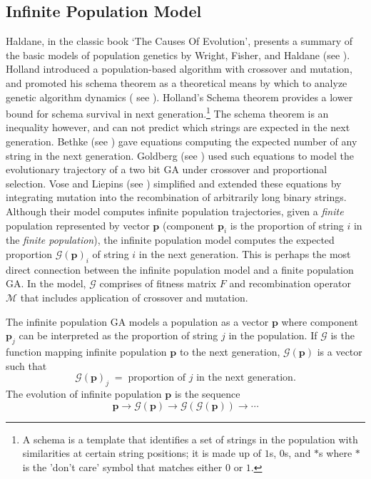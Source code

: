 \subsection{Infinite Population Model}
Haldane, in the classic book `The Causes Of Evolution', presents a summary of the basic models of population genetics 
by Wright, Fisher, and Haldane (see \cite{Haldane1932}). 
Holland introduced a population-based algorithm with crossover and mutation, 
and promoted his schema theorem as a theoretical means by which to analyze genetic algorithm dynamics ( see \cite{Holland1975}). 
Holland's Schema theorem provides a lower bound for schema survival in 
next generation.\footnote{A schema is a template that identifies a set of strings in the population with similarities 
at certain string positions; it is made up of $1$s, $0$s, and $\ast$s where 
$\ast$ is the 'don't care' symbol that matches either $0$ or $1$.} The schema theorem is an inequality however, 
and can not predict which strings are expected in the next generation. 
Bethke (see \cite{Bethke1981}) gave equations computing the expected number of any string in the next generation. 
Goldberg (see \cite{Goldberg1987}) used such equations 
to model the evolutionary trajectory of a two bit GA under crossover 
and proportional selection. Vose and Liepins (see \cite{VoseLiepins1991}) simplified and extended 
these equations by integrating mutation into the recombination of arbitrarily long binary strings. 
Although their model computes infinite population trajectories, given a {\em finite} population represented by vector $\bm{p}$  
(component $\bm{p}_i$ is the proportion of string $i$ in the {\em finite population}), the infinite population model 
computes the expected proportion $\mathcal{G}(\bm{p})_i$ of string $i$ in the next generation.  This is perhaps the most 
direct connection between the infinite population model and a finite population GA. In the model, $\mathcal{G}$ 
comprises of fitness matrix $F$ and recombination operator $\mathcal{M}$ that includes application of crossover and mutation.

The infinite population GA models a population as a vector $\bm{p}$ where component $\bm{p}_j$ 
can be interpreted as the proportion of string $j$ in the population. If $\mathcal{G}$ is the function mapping infinite population $\bm{p}$ to 
the next generation, $\mathcal{G}(\bm{p})$ is a vector such that 
\[
\mathcal{G}(\bm{p})_j \; = \; \text{proportion of $j$ in the next generation}.
\]
The evolution of infinite population $\bm{p}$ is the sequence
\[ \bm{p} \to \mathcal{G}(\bm{p}) \to  {\mathcal{G}}(\mathcal{G}(\bm{p})) \to \cdots \]
\setcounter{footnote}{2}

